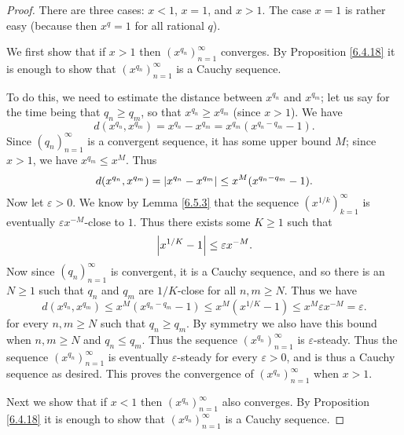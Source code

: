 \begin{proof}
There are three cases: \(x < 1\), \(x = 1\), and \(x > 1\).
The case \(x = 1\) is rather easy (because then \(x^q = 1\) for all rational \(q\)).

We first show that if \(x > 1\) then \((x^{q_n})_{n = 1}^\infty\) converges.
By Proposition \ref{6.4.18} it is enough to show that \((x^{q_n})_{n = 1}^\infty\) is a Cauchy sequence.

To do this, we need to estimate the distance between \(x^{q_n}\) and \(x^{q_m}\);
let us say for the time being that \(q_n \geq q_m\), so that \(x^{q_n} \geq x^{q_m}\) (since \(x > 1\)).
We have
\[
    d(x^{q_n}, x^{q_m}) = x^{q_n} - x^{q_m} = x^{q_m} (x^{q_n - q_m} - 1).
\]
Since \((q_n)_{n = 1}^\infty\) is a convergent sequence, it has some upper bound \(M\);
since \(x > 1\), we have \(x^{q_m} \leq x^M\).
Thus
\[
    d(x^{q_n}, x^{q_m}) = \abs*{x^{q_n} - x^{q_m}} \leq x^M (x^{q_n - q_m} - 1).
\]
Now let \(\varepsilon > 0\).
We know by Lemma \ref{6.5.3} that the sequence \((x^{1 / k})_{k = 1}^\infty\) is eventually \(\varepsilon x^{-M}\)-close to \(1\).
Thus there exists some \(K \geq 1\) such that
\[
    \abs*{x^{1 / K} - 1} \leq \varepsilon x^{-M}.
\]
Now since \((q_n)_{n = 1}^\infty\) is convergent, it is a Cauchy sequence, and so there is an \(N \geq 1\) such that \(q_n\) and \(q_m\) are \(1 / K\)-close for all \(n, m \geq N\).
Thus we have
\[
    d(x^{q_n}, x^{q_m}) \leq x^M (x^{q_n - q_m} - 1) \leq x^M (x^{1 / K} - 1) \leq x^M \varepsilon x^{-M} = \varepsilon.
\]
for every \(n, m \geq N\) such that \(q_n \geq q_m\).
By symmetry we also have this bound when \(n, m \geq N\) and \(q_n \leq q_m\).
Thus the sequence \((x^{q_n})_{n = 1}^\infty\) is \(\varepsilon\)-steady.
Thus the sequence \((x^{q_n})_{n = 1}^\infty\) is eventually \(\varepsilon\)-steady for every \(\varepsilon > 0\), and is thus a Cauchy sequence as desired.
This proves the convergence of \((x^{q_n})_{n = 1}^\infty\) when \(x > 1\).

Next we show that if \(x < 1\) then \((x^{q_n})_{n = 1}^\infty\) also converges.
By Proposition \ref{6.4.18} it is enough to show that \((x^{q_n})_{n = 1}^\infty\) is a Cauchy sequence.


\end{proof}
